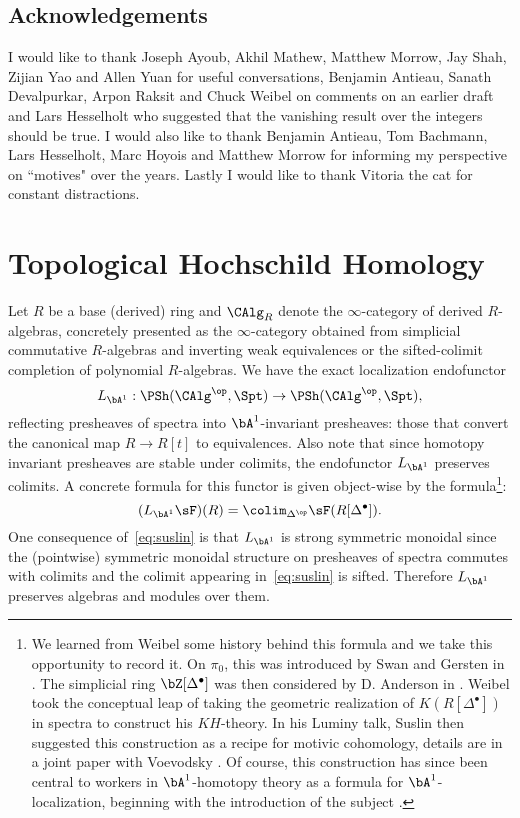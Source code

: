 \documentclass[a4paper,10pt]{amsart}
\begin{document}
\subsection{Acknowledgements} I would like to thank Joseph Ayoub, Akhil Mathew, Matthew Morrow, Jay Shah, Zijian Yao and Allen Yuan for useful conversations, Benjamin Antieau, Sanath Devalpurkar, Arpon Raksit and Chuck Weibel on comments on an earlier draft and Lars Hesselholt who suggested that the vanishing result over the integers should be true. I would also like to thank Benjamin Antieau, Tom Bachmann, Lars Hesselholt, Marc Hoyois and Matthew Morrow for informing my perspective on ``motives" over the years. Lastly I would like to thank Vitoria the cat for constant distractions.

\section{Topological Hochschild Homology}
\sssec{} Let $R$ be a base (derived) ring and $\CAlg_R$ denote the $\infty$-category of derived $R$-algebras, concretely presented as the $\infty$-category obtained from simplicial commutative $R$-algebras and inverting weak equivalences or the sifted-colimit completion of polynomial $R$-algebras. We have the exact localization endofunctor
\[
L_{\bA^1}:\PSh(\CAlg^{\op},\Spt) \rightarrow \PSh(\CAlg^{\op},\Spt),
\]
reflecting presheaves of spectra into $\bA^1$-invariant presheaves: those that convert the canonical map $R \rightarrow R[t]$ to equivalences. Also note that since homotopy invariant presheaves are stable under colimits, the endofunctor $L_{\bA^1}$ preserves colimits. A concrete formula for this functor is given object-wise by the formula\footnote{We learned from Weibel some history behind this formula and we take this opportunity to record it. On $\pi_0$, this was introduced by Swan and Gersten in \cite{gersten-h}. The simplicial ring $\bZ[\Delta^{\bullet}]$ was then considered by D. Anderson in \cite{anderson-k}. Weibel took the conceptual leap of taking the geometric realization of $K(R[\Delta^{\bullet}])$ in spectra to construct his $KH$-theory. In his Luminy talk, Suslin then suggested this construction as a recipe for motivic cohomology, details are in a joint paper with Voevodsky \cite{Suslin:1996}. Of course, this construction has since been central to workers in $\bA^1$-homotopy theory as a formula for $\bA^1$-localization, beginning with the introduction of the subject \cite{MV}.}:
\begin{equation} \label{eq:suslin}
(L_{\bA^1}\sF)(R) = \colim_{\Delta^{\op}} \sF(R[\Delta^{\bullet}]).
\end{equation}
One consequence of~\eqref{eq:suslin} is that $L_{\bA^1}$ is strong symmetric monoidal since the (pointwise) symmetric monoidal structure on presheaves of spectra commutes with colimits and the colimit appearing in~\eqref{eq:suslin} is sifted. Therefore $L_{\bA^1}$ preserves algebras and modules over them. 
\end{document}
